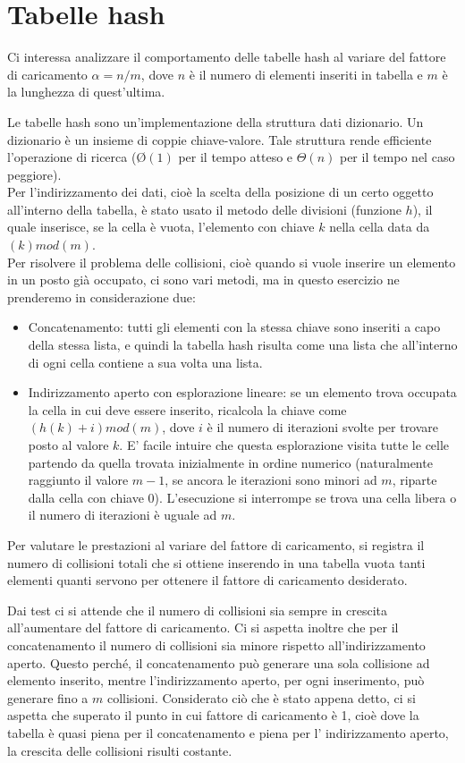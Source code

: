 \documentclass[a4paper, 11pt]{article}
\begin{document}
\section*{Tabelle hash}
\vspace{0,4 cm}
Ci interessa analizzare il comportamento delle tabelle hash al variare del fattore di caricamento $\alpha=n/m$, dove $n$ è il numero di elementi inseriti in tabella e $m$ è la lunghezza di quest'ultima.

\vspace{0,5 cm}
Le tabelle hash sono un'implementazione della struttura dati dizionario. Un dizionario è un insieme di coppie chiave-valore. Tale struttura rende efficiente l'operazione di ricerca (\O$(1)$ per il tempo atteso e $\Theta(n)$ per il tempo nel caso peggiore).\\
Per l'indirizzamento dei dati, cioè la scelta della posizione di un certo oggetto all'interno della tabella, è stato usato il metodo delle divisioni (funzione $h$), il quale inserisce, se la cella è vuota, l'elemento con chiave $k$ nella cella data da $(k)mod(m)$.\\
Per risolvere il problema delle collisioni, cioè quando si vuole inserire un elemento in un posto già occupato, ci sono vari metodi, ma in questo esercizio ne prenderemo in considerazione due:
\begin{itemize}
\item Concatenamento: tutti gli elementi con la stessa chiave sono inseriti a capo della stessa lista, e quindi la tabella hash risulta come una lista che all'interno di ogni cella contiene a sua volta una lista.
\item Indirizzamento aperto con esplorazione lineare: se un elemento trova occupata la cella in cui deve essere inserito, ricalcola la chiave come $(h(k)+i)mod(m)$, dove $i$ è il numero di iterazioni svolte per trovare posto al valore $k$. E' facile intuire che questa esplorazione visita tutte le celle partendo da quella trovata inizialmente in ordine numerico (naturalmente raggiunto il valore $m-1$, se ancora le iterazioni sono minori ad $m$, riparte dalla cella con chiave 0). L'esecuzione si interrompe se trova una cella libera o il numero di iterazioni è uguale ad $m$.
\end{itemize}
Per valutare le prestazioni al variare del fattore di caricamento, si registra il numero di collisioni totali che si ottiene inserendo in una tabella vuota tanti elementi quanti servono per ottenere il fattore di caricamento desiderato.

\vspace{0,5 cm}
Dai test ci si attende che il numero di collisioni sia sempre in crescita all'aumentare del fattore di caricamento. Ci si aspetta inoltre che per il concatenamento il numero di collisioni sia minore rispetto all'indirizzamento aperto. Questo perché, il concatenamento può generare una sola collisione ad elemento inserito, mentre l'indirizzamento aperto, per ogni inserimento, può generare fino a $m$ collisioni. Considerato ciò che è stato appena detto, ci si aspetta che superato il punto in cui fattore di caricamento è 1, cioè dove la tabella è quasi piena per il concatenamento e piena per l' indirizzamento aperto, la crescita delle collisioni risulti costante.
\end{document}
